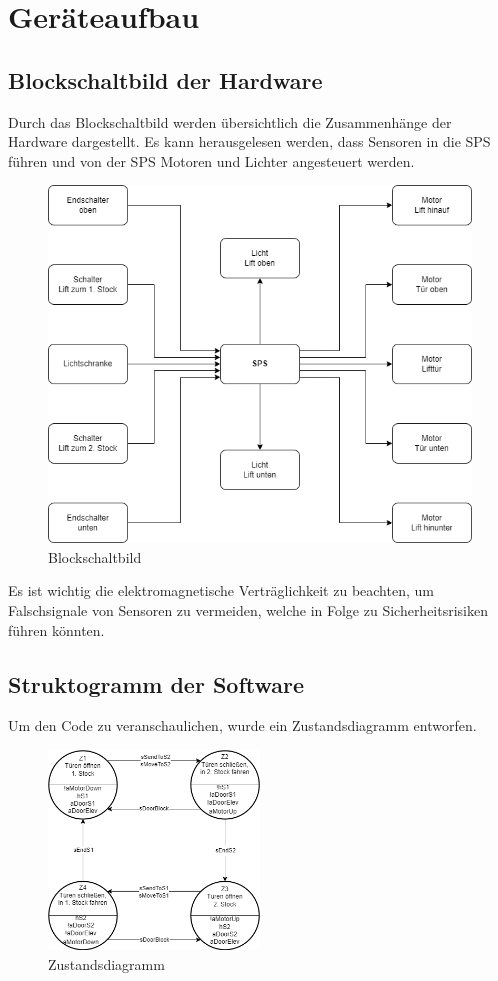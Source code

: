 \section{Geräteaufbau}

\subsection{Blockschaltbild der Hardware}

Durch das Blockschaltbild werden übersichtlich die Zusammenhänge der Hardware dargestellt. Es kann herausgelesen werden, dass Sensoren in die SPS führen und von der SPS Motoren und Lichter angesteuert werden.

\begin{figure}[H]
    \centering
    \includegraphics[width=\textwidth]{./images/Blockschaltbild.png}
    \caption[Blockschaltbild]{Blockschaltbild}
\end{figure}

Es ist wichtig die elektromagnetische Verträglichkeit zu beachten, um Falschsignale von Sensoren zu vermeiden, welche in Folge zu Sicherheitsrisiken führen könnten.

\newpage

\subsection{Struktogramm der Software}

Um den Code zu veranschaulichen, wurde ein Zustandsdiagramm entworfen.

\begin{figure}[H]
    \centering
    \includegraphics[width=0.5\textwidth]{./images/Zustandsdiagramm.png}
    \caption[Zustandsdiagramm]{Zustandsdiagramm}
\end{figure}